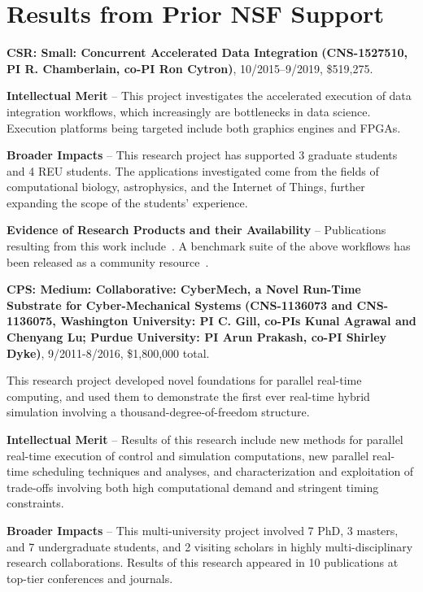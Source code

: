 \section{Results from Prior NSF Support}
\label{sec:prior}

\noindent
{\large\bf CSR: Small: Concurrent Accelerated Data Integration}
{\bf (CNS-1527510,
PI R. Chamberlain, co-PI Ron Cytron)}, 
10/2015--9/2019, \$519,275.  

\textbf{Intellectual Merit} -- This project investigates the
accelerated execution of data integration workflows, which
increasingly are bottlenecks in data science. Execution platforms
being targeted include both graphics engines and FPGAs.

\textbf{Broader Impacts} -- This research project has supported 3
graduate students and 4 REU students.  The applications investigated
come from the fields of computational biology, astrophysics, and the
Internet of Things, further expanding the scope of the students'
experience.

\textbf{Evidence of Research Products and their Availability} --
Publications resulting from this work include~\cite{dibs,c17,mgc16,js16}.
A benchmark suite of the above workflows has been released
as a community resource~\cite{dibsv1}.

\noindent
{\large\bf CPS: Medium: Collaborative: CyberMech, a Novel Run-Time Substrate for 
Cyber-Mechanical Systems}
{\bf (CNS-1136073 and CNS-1136075,
Washington University: PI C. Gill, co-PIs Kunal Agrawal and Chenyang Lu; Purdue University: PI Arun Prakash, co-PI Shirley Dyke)}, 9/2011-8/2016, \$1,800,000 total.  

This research project developed novel foundations for parallel real-time computing, and used them to demonstrate the first ever real-time hybrid simulation involving a thousand-degree-of-freedom structure.

\textbf{Intellectual Merit} -- Results of this research include new methods for parallel real-time execution of control and simulation computations, new parallel real-time scheduling techniques and analyses, and characterization and exploitation of trade-offs involving both high computational demand and stringent timing constraints.

\textbf{Broader Impacts} -- This multi-university project involved 7 PhD, 3 masters, and 7 undergraduate students, and 2 visiting scholars in highly multi-disciplinary research collaborations.  Results of this research appeared in 10 publications at top-tier conferences and journals.

